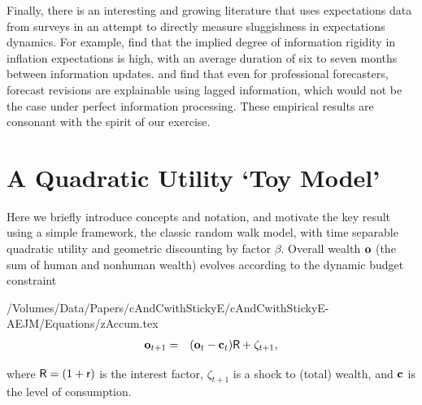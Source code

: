 Finally, there is an interesting and growing literature that uses expectations data from surveys in an attempt to directly measure sluggishness in expectations dynamics.
For example, \cite{coibGor:AER15} find that the implied degree of information rigidity in inflation expectations is high, with an average duration of six to seven months between information updates. \cite{fuhrer:JME17} and \cite{fuhrerIntrinsicPersistence} find that even for professional forecasters, forecast revisions are explainable using lagged information, which would not be the case under perfect information processing.  These empirical results are consonant with the spirit of our exercise.

\hypertarget{Quadratic}{}
\section{A Quadratic Utility `Toy Model'}\label{sec:Quadratic}

Here we briefly introduce concepts and notation, and motivate the key result using a simple framework, the classic \cite{hallRandomWalk} random walk model, with time separable quadratic utility and geometric discounting by factor $\beta$.  Overall wealth $\mathbf{o}$ (the sum of human and nonhuman wealth) evolves according to the dynamic budget constraint
\begin{verbatimwrite}{/Volumes/Data/Papers/cAndCwithStickyE/cAndCwithStickyE-AEJM/Equations/zAccum.tex}
\begin{eqnarray}
  \mathbf{o}_{t+1} & = & (\mathbf{o}_{t}-\mathbf{c}_{t})\mathsf{R}+\zeta_{t+1}, \label{eq:zAccum}
\end{eqnarray}
\end{verbatimwrite}

where $\mathsf{R}=(1+\mathsf{r})$ is the interest factor, $\zeta_{t+1}$ is a shock to (total) wealth, and $\mathbf{c}$ is the level of consumption.

